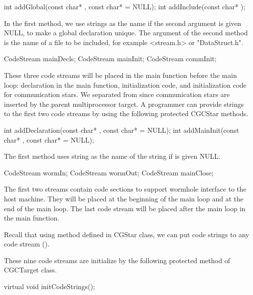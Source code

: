 \begin{example}
int addGlobal(const char* , const char*  = NULL);
int addInclude(const char* );
\end{example}

In the first method, we use  strings as the name if the second
argument is given NULL, to make a global declaration unique.
The argument of the second method is the name of a file to be included, for
example <stream.h> or "DataStruct.h".

\begin{example}
CodeStream mainDecls;
CodeStream mainInit;
CodeStream commInit;
\end{example}

These three code streams will be placed in the main function before the
main loop: declaration in the main function, initialization code, and
initialization code for communication stars. We separated 
from  since communication stars are inserted by the parent
multiprocessor target.
A programmer can provide strings to the first
two code streams by using the following protected CGCStar methods.

\begin{example}
int addDeclaration(const char* , const char*  = NULL);
int addMainInit(const char* , const char*  = NULL);
\end{example}

The first method uses  string as the name of the string if
 is given NULL.

\begin{example}
CodeStream wormIn;
CodeStream wormOut;
CodeStream mainClose;
\end{example}

The first two streams contain code sections to support wormhole interface
to the host machine. They will be placed at the beginning of the main loop and
at the end of the main loop. The last code stream will be placed after the
main loop in the main function.

Recall that using  method defined in CGStar class, we can
put code strings to any code stream ().

These nine code streams are initialize by the following protected method
of CGCTarget class.

\begin{example}
virtual void initCodeStrings();
\end{example}


